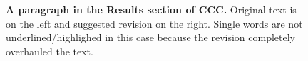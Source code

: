 \documentclass[
]{article}
\providecommand{\DIFaddbeginFL}{} %
\providecommand{\DIFaddendFL}{} %
\providecommand{\DIFdelbeginFL}{} %
\providecommand{\DIFdelendFL}{} %
\newcommand{\DIFscaledelfig}{0.5}
\newlength{\DIFdelgraphicswidth} %
\newlength{\DIFdelgraphicsheight} %
\newcommand{\DIFaddincludegraphics}[2][]{{\color{blue}\fbox{\DIFOincludegraphics[#1]{#2}}}} %
\newcommand{\DIFdelincludegraphics}[2][]{%
\sbox{\DIFdelgraphicsbox}{\DIFOincludegraphics[#1]{#2}}%
\settoboxwidth{\DIFdelgraphicswidth}{\DIFdelgraphicsbox} %
\settoboxtotalheight{\DIFdelgraphicsheight}{\DIFdelgraphicsbox} %
\scalebox{\DIFscaledelfig}{%
\parbox[b]{\DIFdelgraphicswidth}{\usebox{\DIFdelgraphicsbox}\\[-\baselineskip] \rule{\DIFdelgraphicswidth}{0em}}\llap{\resizebox{\DIFdelgraphicswidth}{\DIFdelgraphicsheight}{%
\setlength{\unitlength}{\DIFdelgraphicswidth}%
\begin{picture}(1,1)%
\thicklines\linethickness{2pt} %
{\color[rgb]{1,0,0}\put(0,0){\framebox(1,1){}}}%
{\color[rgb]{1,0,0}\put(0,0){\line( 1,1){1}}}%
{\color[rgb]{1,0,0}\put(0,1){\line(1,-1){1}}}%
\end{picture}%
}\hspace*{3pt}}} %
} %
\DeclareRobustCommand{\DIFaddbeginFL}{\DIFOaddbeginFL \let\includegraphics\DIFaddincludegraphics} %
\DeclareRobustCommand{\DIFaddendFL}{\DIFOaddendFL \let\includegraphics\DIFOincludegraphics} %
\DeclareRobustCommand{\DIFdelbeginFL}{\DIFOdelbeginFL \let\includegraphics\DIFdelincludegraphics} %
\DeclareRobustCommand{\DIFdelendFL}{\DIFOaddendFL \let\includegraphics\DIFOincludegraphics} %
\begin{document}
\begin{figure}
\DIFdelbeginFL %
\DIFdelendFL \DIFaddbeginFL \hypertarget{fig:results:ccc}{%
\centering

\caption{\textbf{A paragraph in the Results section of CCC.}
Original text is on the left and suggested revision on the right.
Single words are not underlined/highlighed in this case because the revision completely overhauled the text.}\label{fig:results:ccc}
}
\DIFaddendFL \end{figure}
\end{document}
